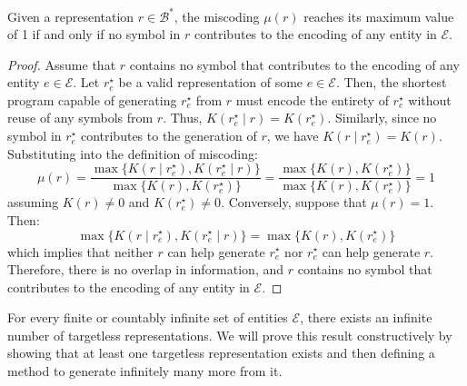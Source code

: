 \begin{proposition}
\label{prop:miscoding_upper_bound}
Given a representation $r \in \mathcal{B}^\ast$, the miscoding $\mu(r)$ reaches its maximum value of 1 if and only if no symbol in $r$ contributes to the encoding of any entity in $\mathcal{E}$.
\end{proposition}
\begin{proof}
Assume that $r$ contains no symbol that contributes to the encoding of any entity $e \in \mathcal{E}$. Let $r^\star_e$ be a valid representation of some $e \in \mathcal{E}$. Then, the shortest program capable of generating $r^\star_e$ from $r$ must encode the entirety of $r^\star_e$ without reuse of any symbols from $r$. Thus, $K(r^\star_e \mid r) = K(r^\star_e)$. Similarly, since no symbol in $r^\star_e$ contributes to the generation of $r$, we have $K(r \mid r^\star_e) = K(r)$. Substituting into the definition of miscoding:
\[
\mu(r) = \frac{ \max\{ K(r \mid r^\star_e), K(r^\star_e \mid r) \} }{ \max\{ K(r), K(r^\star_e) \} } = \frac{ \max\{ K(r), K(r^\star_e) \} }{ \max\{ K(r), K(r^\star_e) \} } = 1
\]
assuming $K(r) \neq 0$ and $K(r^\star_e) \neq 0$. Conversely, suppose that $\mu(r) = 1$. Then:
\[
\max\{ K(r \mid r^\star_e), K(r^\star_e \mid r) \} = \max\{ K(r), K(r^\star_e) \}
\]
which implies that neither $r$ can help generate $r^\star_e$ nor $r^\star_e$ can help generate $r$. Therefore, there is no overlap in information, and $r$ contains no symbol that contributes to the encoding of any entity in $\mathcal{E}$.
\end{proof}

For every finite or countably infinite set of entities $\mathcal{E}$, there exists an infinite number of targetless representations. We will prove this result constructively by showing that at least one targetless representation exists and then defining a method to generate infinitely many more from it.

